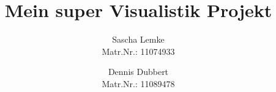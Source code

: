 \title{Mein super Visualistik Projekt}


\author{Sascha Lemke\\ %
        \scriptsize Matr.Nr.: 11074933 %
\and Dennis Dubbert\\ %
     \scriptsize Matr.Nr.: 11089478}

